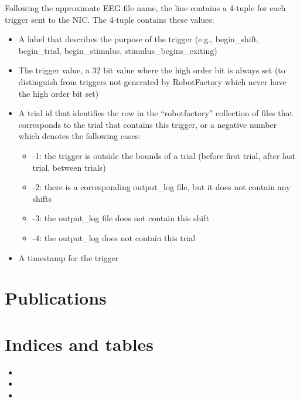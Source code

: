 \documentclass[letterpaper,10pt,english]{sphinxmanual}
\begin{document}
Following the approximate EEG file name, the line contains a 4-tuple for
each trigger sent to the NIC. The 4-tuple contains these values:
\begin{itemize}
\item {} 
A label that describes the purpose of the trigger (e.g.,
begin\_shift, begin\_trial, begin\_stimulus,
stimulus\_begins\_exiting)

\item {} 
The trigger value, a 32 bit value where the high order bit is always
set (to distinguish from triggers not generated by RobotFactory which
never have the high order bit set)

\item {} 
A trial id that identifies the row in the “robotfactory” collection
of files that corresponds to the trial that contains this trigger, or
a negative number which denotes the following cases:
\begin{itemize}
\item {} 
-1: the trigger is outside the bounds of a trial (before first
trial, after last trial, between trials)

\item {} 
-2: there is a corresponding output\_log file, but it does not
contain any shifts

\item {} 
-3: the output\_log file does not contain this shift

\item {} 
-4: the output\_log does not contain this trial

\end{itemize}

\item {} 
A timestamp for the trigger

\end{itemize}


\chapter{Publications}
\label{\detokenize{About::doc}}\label{\detokenize{About:publications}}

\chapter{Indices and tables}
\label{\detokenize{index:indices-and-tables}}\begin{itemize}
\item {} 

\item {} 

\item {} 

\end{itemize}



\renewcommand{\indexname}{Index}
\printindex
\end{document}
